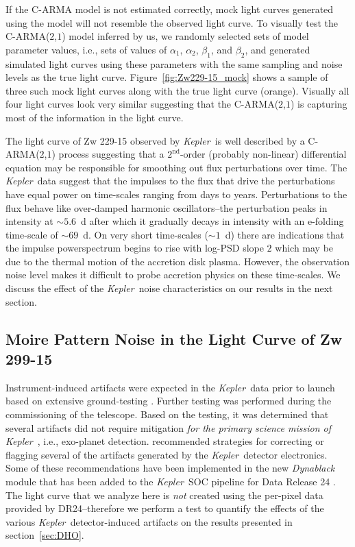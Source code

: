 \documentclass[a4paper,fleqn,usenatbib]{mnras}
\newcommand{\Kepler}{\textit{Kepler~}}
\begin{document}
If the C-ARMA model is not estimated correctly, mock light curves generated using the model will not resemble the observed light curve. To visually test the C-ARMA($2$,$1$) model inferred by us, we randomly selected sets of model parameter values, i.e., sets of values of $\alpha_{1}$, $\alpha_{2}$, $\beta_{1}$, and $\beta_{2}$, and generated simulated light curves using these parameters with the same sampling and noise levels as the true light curve. Figure~\ref{fig:Zw229-15_mock} shows a sample of three such mock light curves along with the true light curve (orange). Visually all four light curves look very similar suggesting that the C-ARMA($2$,$1$) is capturing most of the information in the light curve. 

The light curve of Zw 229-15 observed by \Kepler is well described by a C-ARMA($2$,$1$) process suggesting that a $2^{\mathrm{nd}}$-order (probably non-linear) differential equation may be responsible for smoothing out flux perturbations over time. The \Kepler data suggest that the impulses to the flux that drive the perturbations have equal power on time-scales ranging from days to years. Perturbations to the flux behave like over-damped harmonic oscillators--the perturbation peaks in intensity at $\sim 5.6$~d after which it gradually decays in intensity with an $\mathrm{e}$-folding time-scale of $\sim 69$~d. On very short time-scales ($\sim 1$~d) there are indications that the impulse powerspectrum begins to rise with log-PSD slope $2$ which may be due to the thermal motion of the accretion disk plasma. However, the observation noise level makes it difficult to probe accretion physics on these time-scales. We discuss the effect of the \Kepler noise characteristics on our results in the next section.

\subsection[Moire Pattern Noise]{Moire Pattern Noise in the Light Curve of Zw 299-15}\label{sec:MPD}

Instrument-induced artifacts were expected in the \Kepler data prior to launch based on extensive ground-testing \citep{Kol10}. Further testing was performed during the commissioning of the telescope. Based on the testing, it was determined that several artifacts did not require mitigation \textit{for the primary science mission of} \Kepler, i.e., exo-planet detection. \citet{Kol10} recommended strategies for correcting or flagging several of the artifacts generated by the \Kepler detector electronics. Some of these recommendations have been implemented in the new \textit{Dynablack} module \citep{Clarke14} that has been added to the \Kepler SOC pipeline for Data Release 24 \citep{DR24}. The light curve that we analyze here is \textit{not} created using the per-pixel data provided by DR24--therefore we perform a test to quantify the effects of the various \Kepler detector-induced artifacts on the results presented in section~\ref{sec:DHO}. 
\end{document}
